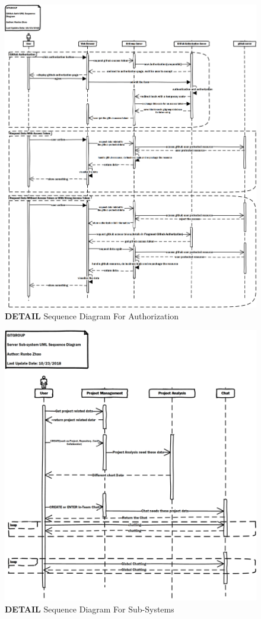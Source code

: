 \documentclass[12pt,a4paper]{report}
\begin{document}
\begin{figure}[h]
	\centering
	\includegraphics[width=\textwidth]{./pics/AuthSequenceDiagram.png}
	\caption{\textbf{DETAIL} Sequence Diagram For Authorization}
\end{figure}

\begin{figure}[h]
	\centering
	\includegraphics[width=\textwidth]{./pics/SubSysSequenceDiagram.png}
	\caption{\textbf{DETAIL} Sequence Diagram For Sub-Systems}
\end{figure}
\end{document}
